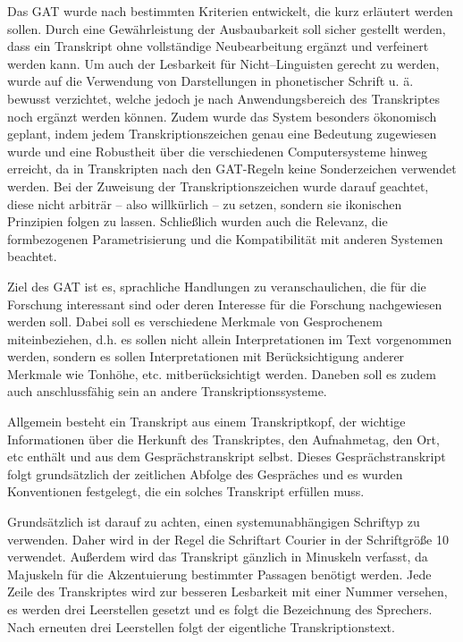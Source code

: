 Das GAT wurde nach bestimmten Kriterien entwickelt, die kurz erläutert werden sollen. 
Durch eine Gewährleistung der Ausbaubarkeit soll sicher gestellt werden, dass ein Transkript ohne vollständige Neubearbeitung ergänzt und verfeinert werden kann. 
Um auch der Lesbarkeit für Nicht--Linguisten gerecht zu werden, wurde auf die Verwendung von Darstellungen in phonetischer Schrift u. ä. bewusst verzichtet, welche jedoch je nach Anwendungsbereich des Transkriptes noch ergänzt werden können. 
Zudem wurde das System besonders ökonomisch geplant, indem jedem Transkriptionszeichen genau eine Bedeutung zugewiesen wurde und eine Robustheit über die verschiedenen Computersysteme hinweg erreicht, da in Transkripten nach den GAT-Regeln keine Sonderzeichen verwendet werden. 
Bei der Zuweisung der Transkriptionszeichen wurde darauf geachtet, diese nicht arbiträr -- also willkürlich -- zu setzen, sondern sie ikonischen Prinzipien folgen zu lassen. 
Schließlich wurden auch die Relevanz, die formbezogenen Parametrisierung und die Kompatibilität mit anderen Systemen beachtet. 

Ziel des GAT ist es, sprachliche Handlungen zu veranschaulichen, die für die Forschung interessant sind oder deren Interesse für die Forschung nachgewiesen werden soll.
Dabei soll es verschiedene Merkmale von Gesprochenem miteinbeziehen, d.h. es sollen nicht allein Interpretationen im Text vorgenommen werden, sondern es sollen Interpretationen mit Berücksichtigung anderer Merkmale wie Tonhöhe, etc. mitberücksichtigt werden.
Daneben soll es zudem auch anschlussfähig sein an andere Transkriptionssysteme\cite[S.\,92f]{MS98}.

Allgemein besteht ein Transkript aus einem Transkriptkopf, der wichtige Informationen über die Herkunft des Transkriptes, den Aufnahmetag, den Ort, etc enthält und aus dem Gesprächstranskript selbst. 
Dieses Gesprächstranskript folgt grundsätzlich der zeitlichen Abfolge des Gespräches und es wurden Konventionen festgelegt, die ein solches Transkript erfüllen muss. 

Grundsätzlich ist darauf zu achten, einen systemunabhängigen Schriftyp zu verwenden. 
Daher wird in der Regel die Schriftart Courier in der Schriftgröße 10 verwendet. 
Außerdem wird das Transkript gänzlich in Minuskeln verfasst, da Majuskeln für die Akzentuierung bestimmter Passagen benötigt werden. 
Jede Zeile des Transkriptes wird zur besseren Lesbarkeit mit einer Nummer versehen, es werden drei Leerstellen gesetzt und es folgt die Bezeichnung des Sprechers. 
Nach erneuten drei Leerstellen folgt der eigentliche Transkriptionstext\cite[S.\,95]{MS98}.

